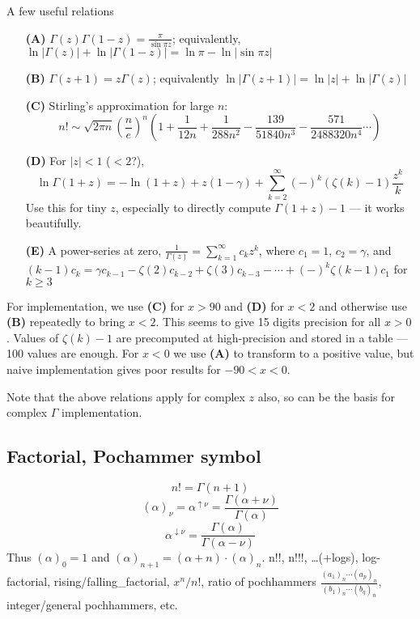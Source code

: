 \documentclass[10pt,dvipdfmx,letterpaper,twoside]{article}
\newenvironment{implementation}{\noindent\begin{framed}}{\end{framed}}
\let\al=\alpha
\let\Gam=\Gamma
\begin{document}
\begin{implementation}
A few useful relations
\begin{itemize}
\item[\bf(A)] $\Gam(z)\Gam(1-z) = \frac{\pi}{\sin\pi z}$; equivalently, $\ln|\Gam(z)| + \ln|\Gam(1-z)| = \ln\pi - \ln|\sin\pi z|$
\item[\bf(B)] $\Gam(z+1) = z\Gam(z)$; equivalently $\ln|\Gam(z+1)| = \ln|z| + \ln|\Gam(z)|$
\item[\bf(C)] Stirling's approximation for large $n$:
  \[n! \sim \sqrt{2\pi n}\left(\frac{n}{e}\right)^n\left(
      1 + \frac{1}{12 n} + \frac{1}{288 n^2} - \frac{139}{51840 n^3} - \frac{571}{2488320 n^4} \cdots\right)\]
\item[\bf(D)] For $|z|<1$ ($<2$?),
  \[ \ln\Gam(1+z) = -\ln(1+z) + z(1-\gamma) + \sum_{k=2}^\infty(-)^k(\zeta(k)-1)\frac{z^k}{k} \]
  Use this for tiny $z$, especially to directly compute $\Gam(1+z)-1$ --- it works beautifully.
\item[\bf(E)] A power-series at zero, $\frac{1}{\Gam(z)} = \sum_{k=1}^\infty c_k z^k$, where $c_1=1$, $c_2=\gamma$,
  and $(k-1)c_k = \gamma c_{k-1} - \zeta(2) c_{k-2} + \zeta(3) c_{k-3} - \cdots + (-)^k \zeta(k-1) c_1$ for $k\geq3$
\end{itemize}
For implementation, we use {\bf(C)} for $x>90$ and {\bf(D)} for $x<2$ and otherwise use {\bf(B)} repeatedly to bring $x<2$.  This seems to
give 15 digits precision for all $x>0$.  Values of $\zeta(k)-1$ are precomputed at high-precision and stored in a table --- 100 values are enough.
For $x<0$ we use {\bf(A)} to transform to a positive value, but naive implementation gives poor results for $-90<x<0$.

Note that the above relations apply for complex $z$ also, so can be the basis for complex $\Gam$ implementation.
\end{implementation}

\subsection{Factorial, Pochammer symbol}
\[ n! = \Gam(n+1) \]
\[ (\al)_\nu = \al^{\uparrow \nu} = \frac{\Gam(\al+\nu)}{\Gam(\al)} \]
\[ \al^{\downarrow \nu} = \frac{\Gam(\al)}{\Gam(\al-\nu)} \]
Thus $(\al)_0 = 1$ and $(\al)_{n+1} = (\al+n)\cdot(\al)_n$.
n!!, n!!!, \dots (+logs), log-factorial, rising/falling\_factorial, $x^n/n!$,
ratio of pochhammers $\frac{(a_1)_n\cdots(a_p)_n}{(b_1)_n\cdots(b_q)_n}$,
integer/general pochhammers, etc.
\end{document}
